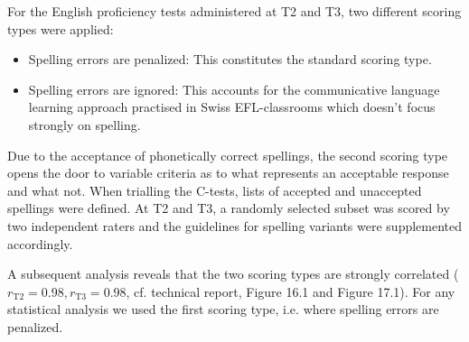 \documentclass[output=paper]{langsci/langscibook}
\begin{document}
For the English proficiency tests administered at T2 and T3, two different scoring types were applied: 

\begin{itemize}
\item
Spelling errors are penalized: This constitutes the standard scoring type.
\item
Spelling errors are ignored: This accounts for the communicative language learning approach practised in Swiss EFL-classrooms which doesn’t focus strongly on spelling.
\end{itemize}

Due to the acceptance of phonetically correct spellings, the second scoring type opens the door to variable criteria as to what represents an acceptable response and what not. When trialling the C-tests, lists of accepted and unaccepted spellings were defined. At T2 and T3, a randomly selected subset was scored by two independent raters and the guidelines for spelling variants were supplemented accordingly. 

A subsequent analysis reveals that the two scoring types are strongly correlated ($r_{\text{T2}}=0.98, r_{\text{T3}}=0.98$, cf. technical report, Figure 16.1 and Figure 17.1). For any statistical analysis we used the first scoring type, i.e. where spelling errors are penalized.
\sloppy\printbibliography[heading=subbibliography,notkeyword=this]
\end{document}
